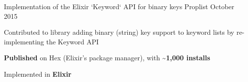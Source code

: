 \begin{cventries}

    \cventry
    {Implementation of the Elixir `Keyword` API for binary keys} %
    {Proplist} %
    {}{October 2015}{
        \begin{cvitems} %
            \item {Contributed to library adding binary (string) key support to keyword lists by re-implementing the Keyword API}
            \item {\textbf{Published} on Hex (Elixir's package manager), with \textbf{\textasciitilde1,000 installs}}
            \item {Implemented in \textbf{Elixir}}
        \end{cvitems}
    }

\end{cventries}
